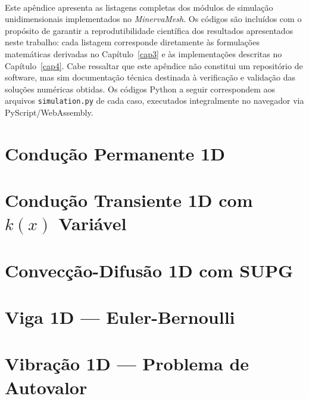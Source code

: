 \paragraph{}Este apêndice apresenta as listagens completas dos módulos de simulação unidimensionais implementados no \textit{MinervaMesh}. Os códigos são incluídos com o propósito de garantir a reprodutibilidade científica dos resultados apresentados neste trabalho: cada listagem corresponde diretamente às formulações matemáticas derivadas no Capítulo~\ref{cap3} e às implementações descritas no Capítulo~\ref{cap4}. Cabe ressaltar que este apêndice não constitui um repositório de software, mas sim documentação técnica destinada à verificação e validação das soluções numéricas obtidas. Os códigos Python a seguir correspondem aos arquivos \texttt{simulation.py} de cada caso, executados integralmente no navegador via PyScript/WebAssembly.

\section{Condução Permanente 1D}
\label{ap:conducao1d}



\section{Condução Transiente 1D com $k(x)$ Variável}
\label{ap:calor_transiente}



\section{Convecção-Difusão 1D com SUPG}
\label{ap:convdif1d}



\section{Viga 1D --- Euler-Bernoulli}
\label{ap:viga1d}



\section{Vibração 1D --- Problema de Autovalor}
\label{ap:vibracao1d}


